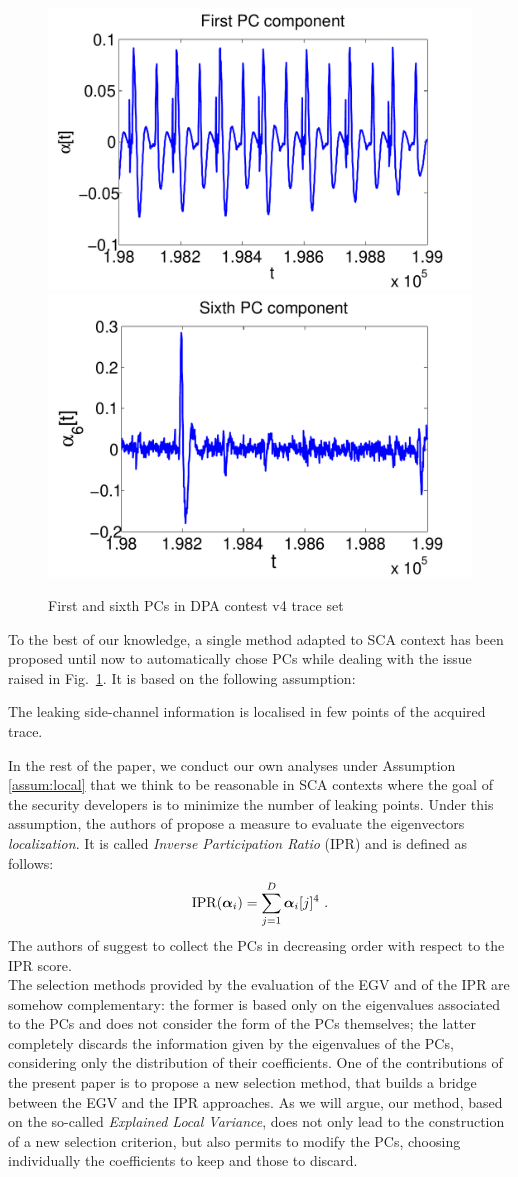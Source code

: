 \begin{figure}
\includegraphics[width=.45\textwidth]{figures/DPAcontestPC1.pdf} 
\includegraphics[width=.45\textwidth]{figures/DPAcontestPC6.pdf} 
\caption{First and sixth PCs in DPA contest v4 trace set}\label{fig:DPAcontest}
\end{figure}
To the best of our knowledge, a single method adapted to SCA context has been proposed until now to automatically chose PCs \cite{SCAclassProbl} while dealing with the issue raised in Fig.~\ref{fig:DPAcontest}. It is based on the following assumption:
\begin{assumption}\label{assum:local}
The leaking side-channel information is localised in few points of the acquired trace.
\end{assumption}
In the rest of the paper, we conduct our own analyses under Assumption \ref{assum:local} that we think to be reasonable in SCA contexts where the goal of the security developers is to minimize the number of leaking points.
Under this assumption, the authors of \cite{SCAclassProbl} propose a measure to evaluate the eigenvectors {\em localization}. It is called {\em Inverse Participation Ratio} (IPR) and is defined as follows:
\begin{equation}
\mathrm{IPR}(\boldsymbol\alpha_i) = \sum_{j=1}^D \boldsymbol\alpha_i[j]^4 \mbox{ .}
\end{equation}
The authors of \cite{SCAclassProbl} suggest to collect the PCs in decreasing order with respect to the IPR score.\\

The selection methods provided by the evaluation of the EGV and of the IPR are somehow complementary: the former is based only on the eigenvalues associated to the PCs and does not consider the form of the PCs themselves; the latter completely discards the information given by the eigenvalues of the PCs, considering only the distribution of their coefficients. One of the contributions of the present paper is to propose a new selection method, that builds a bridge between the EGV and the IPR approaches. As we will argue, our method, based on the so-called {\em Explained Local Variance}, does not only lead to the construction of a new selection criterion, but also permits  to modify the PCs, choosing individually the coefficients to keep and those to discard. 

